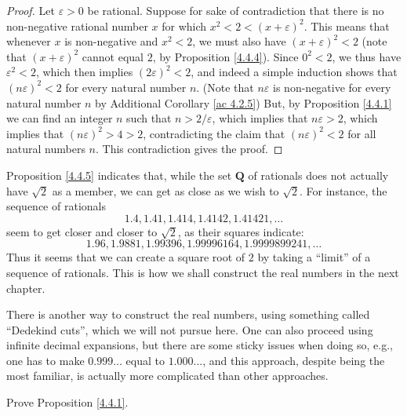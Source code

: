 \begin{proof}
    Let \(\varepsilon > 0\) be rational.
    Suppose for sake of contradiction that there is no non-negative rational number \(x\) for which \(x^2 < 2 < (x + \varepsilon)^2\).
    This means that whenever \(x\) is non-negative and \(x^2 < 2\), we must also have \((x + \varepsilon)^2 < 2\)
    (note that \((x + \varepsilon)^2\) cannot equal \(2\), by Proposition \ref{4.4.4}).
    Since \(0^2 < 2\), we thus have \(\varepsilon^2 < 2\), which then implies \((2\varepsilon)^2 < 2\), and indeed a simple induction shows that \((n\varepsilon)^2 < 2\) for every natural number \(n\).
    (Note that \(n\varepsilon\) is non-negative for every natural number \(n\) by Additional Corollary \ref{ac 4.2.5})
    But, by Proposition \ref{4.4.1} we can find an integer \(n\) such that \(n > 2 / \varepsilon\), which implies that \(n\varepsilon > 2\), which implies that \((n\varepsilon)^2 > 4 > 2\), contradicting the claim that \((n\varepsilon)^2 < 2\) for all natural numbers \(n\).
    This contradiction gives the proof.
\end{proof}

\begin{note}
    Proposition \ref{4.4.5} indicates that, while the set \(\mathbf{Q}\) of rationals does not actually have \(\sqrt{2}\) as a member, we can get as close as we wish to \(\sqrt{2}\).
    For instance, the sequence of rationals
    \[
        1.4, 1.41, 1.414, 1.4142, 1.41421, \dots
    \]
    seem to get closer and closer to \(\sqrt{2}\), as their squares indicate:
    \[
        1.96, 1.9881, 1.99396, 1.99996164, 1.9999899241, \dots
    \]
    Thus it seems that we can create a square root of \(2\) by taking a ``limit'' of a sequence of rationals.
    This is how we shall construct the real numbers in the next chapter.
\end{note}

\begin{note}
    There is another way to construct the real numbers, using something called ``Dedekind cuts'', which we will not pursue here.
    One can also proceed using infinite decimal expansions, but there are some sticky issues when doing so, e.g., one has to make \(0.999\dots\) equal to \(1.000\dots\), and this approach, despite being the most familiar, is actually more complicated than other approaches.
\end{note}

\exercisesection

\begin{exercise}\label{ex 4.4.1}
    Prove Proposition \ref{4.4.1}.
\end{exercise}

